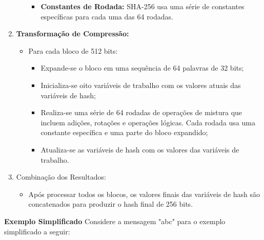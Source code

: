 \documentclass[a4paper,12pt]{article}
\begin{document}
\begin{enumerate}
\begin{itemize}
\begin{itemize}
                    \item \textbf{Constantes de Rodada:} SHA-256 usa uma série de constantes específicas para cada uma das 64 rodadas.
                \end{itemize}
        \end{itemize}
    \item \textbf{Transformação de Compressão:}
        \begin{itemize}
            \item Para cada bloco de 512 bits:
                \begin{itemize}
                    \item Expande-se o bloco em uma sequência de 64 palavras de 32 bits;
                    \item Inicializa-se oito variáveis de trabalho com os valores atuais das variáveis de hash;
                    \item Realiza-se uma série de 64 rodadas de operações de mistura que incluem adições, rotações e operações lógicas. Cada rodada usa uma constante específica e uma parte do bloco expandido;
                    \item Atualiza-se as variáveis de hash com os valores das variáveis de trabalho.
                \end{itemize}
        \end{itemize}
    \item Combinação dos Resultados:
        \begin{itemize}
            \item Após processar todos os blocos, os valores finais das variáveis de hash são concatenados para produzir o hash final de 256 bits.
        \end{itemize}
\end{enumerate}

\textbf*{Exemplo Simplificado}
Considere a mensagem "abc" para o exemplo simplificado a seguir:
\end{document}
